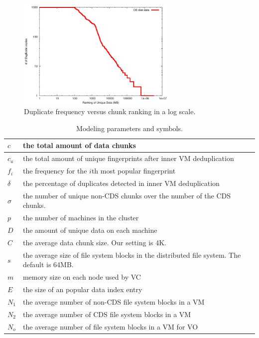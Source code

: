 \begin{figure}
\centering
 \includegraphics[width=3in]{figures/log-log-disk.pdf}
\caption{Duplicate frequency versus  chunk ranking in a log scale.}
\label{fig:Datazipf}
\end{figure}

\begin{table}[ht]
\centering
\begin{tabular}{|p{1.25cm}|p{6.5cm}|}
\hline
$c$ &  the total amount of data chunks\\ 
\hline
$c_u$ &  the total amount of unique fingerprints after inner VM  deduplication\\
\hline
$f_i$ &  the frequency for the $i$th most popular fingerprint\\
\hline
$\delta$ &  the percentage of duplicates detected in inner VM deduplication\\
\hline
$\sigma$ &  the number of unique non-CDS chunks over  the number of the CDS chunks.\\
\hline
$p$ & the number of machines in the cluster\\
\hline
$D$ & the amount of unique data on each machine\\
\hline
$C$ & the average data chunk size. Our setting is  4K.\\
\hline
$s$ & the average size of file system blocks in the distributed file system. The default is  64MB.\\
\hline
$m$ & memory size on each node used by VC\\ 
\hline
$E$ & the size of an popular data index entry\\
\hline
$N_1$ & the average number  of non-CDS file system blocks  in a VM\\
\hline
$N_2$ & the average number  of CDS file system blocks  in a VM\\
\hline
$N_o$ & the average number  of file system blocks  in a VM for VO\\
\hline
\end{tabular}
\caption{Modeling  parameters and symbols.}
\label{tab:symbol}
\end{table}

